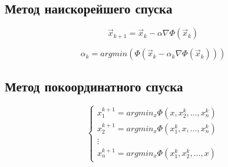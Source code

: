 \documentclass[10pt,a4paper]{article}
\begin{document}
		\subsection{Метод наискорейшего спуска}
		
		\begin{equation}
			\vec{x}_{k + 1} = \vec{x}_{k} - \alpha \nabla 
			\Phi\left(\vec{x}_{k}\right)
		\end{equation}
		
		\begin{equation}
			\alpha_{k} = argmin\left(\Phi\left(\vec{x}_{k} - 
			\alpha_{k}\nabla \Phi\left(\vec{x}_{k}\right)\right)\right)
		\end{equation}
		
		\subsection{Метод покоординатного спуска}
		
		\begin{equation}
			\begin{cases}
				x_{1}^{k+1} = argmin_{x}\Phi\left(x, x_{2}^{k}, \ldots, 
			x_{n}^{k}\right)
			\\
				x_{2}^{k+1} = argmin_{x}\Phi\left(x_{1}^{k}, x, \ldots, 
			x_{n}^{k}\right)
			\\
			\vdots
			\\
				x_{n}^{k+1} = argmin_{x}\Phi\left(x_{1}^{k}, x_{2}^{k}, \ldots, 
			x\right)
			\end{cases}
		\end{equation}
\end{document}
